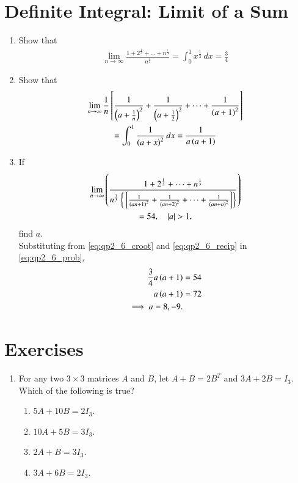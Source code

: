 \documentclass[journal,12pt,twocolumn]{IEEEtran}
\renewcommand\thesection{\arabic{section}}
\begin{document}
\section{Definite Integral: Limit of a Sum}
\begin{enumerate}[label=\thesection.\arabic*
,ref=\thesection.\theenumi]
\item Show that 
\begin{align}
\label{eq:qp2_6_croot}
\lim_{n \to \infty}
\frac{1 + 2^{\frac{1}{3}}+ \dots +n^{\frac{1}{3}}}{n^{\frac{4}{3}}} 
= \int_{0}^{1}x^{\frac{1}{3}}\, dx = \frac{3}{4}
\end{align}
\item Show that 
\begin{multline}
\label{eq:qp2_6_recip}
\lim_{n \to \infty}
\frac{1}{n}{}\left[\frac{1}{\left(a+\frac{1}{n}\right)^2}+\frac{1}{\left(a+\frac{1}{2}\right)^2}+\dots+\frac{1}{\left(a+1\right)^2}\right]
\\
= \int_{0}^{1}\frac{1}{\left(a+x\right)^2}\, dx = \frac{1}{a\left(a+1\right)}
\end{multline}
\item If 
\begin{multline}
\label{eq:qp2_6_prob}
\lim_{n \to \infty}\left(
\frac{1 + 2^{\frac{1}{3}}+ \dots +n^{\frac{1}{3}}}{n^{\frac{7}{3}}\left\{{}\left[\frac{1}{\left(an+1\right)^2}+\frac{1}{\left(an+2\right)^2}+\dots+\frac{1}{\left(an+n\right)^2}\right]
\right\}}\right) 
\\
= 54, \quad \left\vert a\right\vert > 1,
\end{multline}
%
find $a$.
\\
\solution Substituting from \eqref{eq:qp2_6_croot} and \eqref{eq:qp2_6_recip} in \eqref{eq:qp2_6_prob},
\begin{align}
\frac{3}{4}a\left(a+1\right) &= 54
\nonumber \\
a\left(a+1\right) &= 72
\nonumber \\
\implies a = 8,-9.
\end{align}
%
\end{enumerate}
\section{Exercises}
\begin{enumerate}[label=\arabic*.]
\item For any two $3 \times 3$ matrices $A$ and $B$, let $A+B = 2B^T$ and $3A+2B=I_3$.  Which of the following 
is true?
\begin{enumerate}
\item $5A+10B=2I_3$.
\item $10A+5B=3I_3$.
\item $2A+B=3I_3$.
\item $3A+6B=2I_3$.
\end{enumerate}
\end{enumerate}
\end{document}

